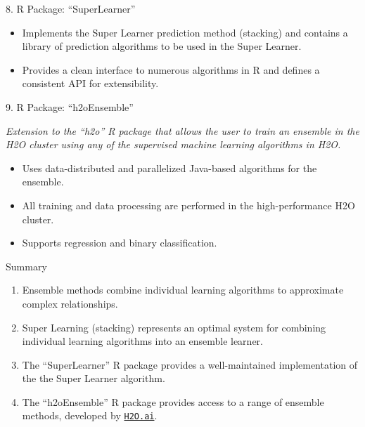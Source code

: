\documentclass[12pt,t]{beamer}
\begin{document}
\begin{frame}[c]{8. R Package: ``SuperLearner''}

\vspace*{3mm}

\centering

  \begin{itemize}
    \itemsep12pt
    \item Implements the Super Learner prediction method (stacking) and
          contains a library of prediction algorithms to be used in the Super
          Learner.
    \item Provides a clean interface to numerous algorithms in R and defines a
          consistent API for extensibility.
  \end{itemize}

\note{
}
\end{frame}


\begin{frame}{9. R Package: ``h2oEnsemble''}

\vspace*{3mm}

\centering

\textit{Extension to the ``h2o'' R package that allows the user to train an
ensemble in the H2O cluster using any of the supervised machine learning
algorithms in H2O.}

\vspace{1em}

  \begin{itemize}
    \itemsep12pt
    \item Uses data-distributed and parallelized Java-based algorithms for the
          ensemble.
    \item All training and data processing are performed in the
          high-performance H2O cluster.
    \item Supports regression and binary classification.
  \end{itemize}

\note{
}
\end{frame}


\begin{frame}[c]{Summary}

  \begin{enumerate}
  \itemsep12pt
    \item Ensemble methods combine individual learning algorithms to approximate
          complex relationships.
    \item Super Learning (stacking) represents an optimal system for combining
          individual learning algorithms into an ensemble learner.
    \item The ``SuperLearner'' R package provides a well-maintained
          implementation of the the Super Learner algorithm.
    \item The ``h2oEnsemble'' R package provides access to a range of ensemble
          methods, developed by \href{http://www.h2o.ai}{\tt H2O.ai}.
  \end{enumerate}

\end{frame}
\end{document}
